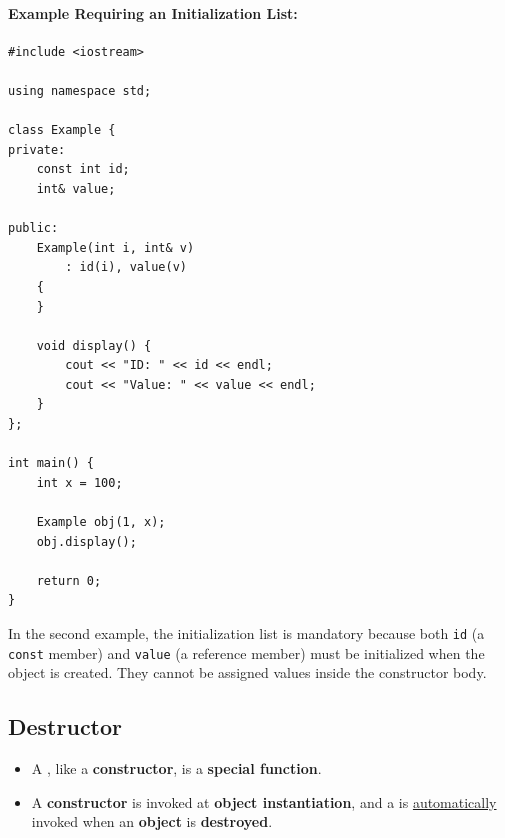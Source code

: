 \documentclass[10pt]{article}
\newcommand{\pbreak}{\vspace{30pt}}
\newcommand{\vocab}[1]{\fbox{\textbf{\textit{#1}}}}
\begin{document}
\paragraph{Example Requiring an Initialization List:}

\begin{verbatim}
#include <iostream>

using namespace std;

class Example {
private:
    const int id;
    int& value;

public:
    Example(int i, int& v)
        : id(i), value(v)
    {
    }

    void display() {
        cout << "ID: " << id << endl;
        cout << "Value: " << value << endl;
    }
};

int main() {
    int x = 100;

    Example obj(1, x);
    obj.display();

    return 0;
}
\end{verbatim}

In the second example, the initialization list is mandatory because both
\verb|id| (a \verb|const| member) and \verb|value| (a reference member) must
be initialized when the object is created. They cannot be assigned values
inside the constructor body.

\newpage
\subsection{Destructor}
\begin{itemize}
	\item A \vocab{destructor}, like a \textbf{constructor}, is a \textbf{special function}.
	\item A \textbf{constructor} is invoked at \textbf{object instantiation}, and a  is \underline{automatically} invoked when an \textbf{object} is \textbf{destroyed}.
\end{itemize}

\pbreak
\end{document}
